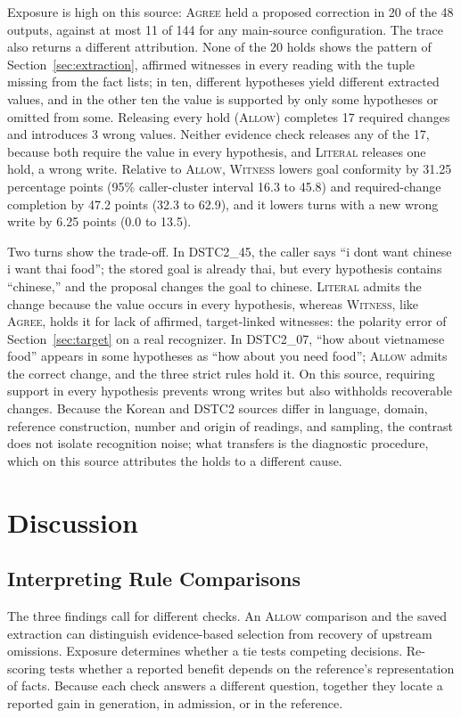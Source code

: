 \documentclass[acmsmall,review]{acmart}
\newcommand{\agree}{\textsc{Agree}}
\newcommand{\allow}{\textsc{Allow}}
\newcommand{\literal}{\textsc{Literal}}
\newcommand{\witness}{\textsc{Witness}}
\begin{document}
Exposure is high on this source: \agree{} held a proposed correction in 20 of the 48 outputs, against at most 11 of 144 for any main-source configuration. The trace also returns a different attribution. None of the 20 holds shows the pattern of Section~\ref{sec:extraction}, affirmed witnesses in every reading with the tuple missing from the fact lists; in ten, different hypotheses yield different extracted values, and in the other ten the value is supported by only some hypotheses or omitted from some. Releasing every hold (\allow{}) completes 17 required changes and introduces 3 wrong values. Neither evidence check releases any of the 17, because both require the value in every hypothesis, and \literal{} releases one hold, a wrong write. Relative to \allow{}, \witness{} lowers goal conformity by 31.25 percentage points (95\% caller-cluster interval 16.3 to 45.8) and required-change completion by 47.2 points (32.3 to 62.9), and it lowers turns with a new wrong write by 6.25 points (0.0 to 13.5).

Two turns show the trade-off. In DSTC2\_45, the caller says ``i dont want chinese i want thai food''; the stored goal is already thai, but every hypothesis contains ``chinese,'' and the proposal changes the goal to chinese. \literal{} admits the change because the value occurs in every hypothesis, whereas \witness{}, like \agree{}, holds it for lack of affirmed, target-linked witnesses: the polarity error of Section~\ref{sec:target} on a real recognizer. In DSTC2\_07, ``how about vietnamese food'' appears in some hypotheses as ``how about you need food''; \allow{} admits the correct change, and the three strict rules hold it. On this source, requiring support in every hypothesis prevents wrong writes but also withholds recoverable changes. Because the Korean and DSTC2 sources differ in language, domain, reference construction, number and origin of readings, and sampling, the contrast does not isolate recognition noise; what transfers is the diagnostic procedure, which on this source attributes the holds to a different cause.

\section{Discussion}\label{sec:discussion}
\subsection{Interpreting Rule Comparisons}
The three findings call for different checks. An \allow{} comparison and the saved extraction can distinguish evidence-based selection from recovery of upstream omissions. Exposure determines whether a tie tests competing decisions. Re-scoring tests whether a reported benefit depends on the reference's representation of facts. Because each check answers a different question, together they locate a reported gain in generation, in admission, or in the reference.
\end{document}
